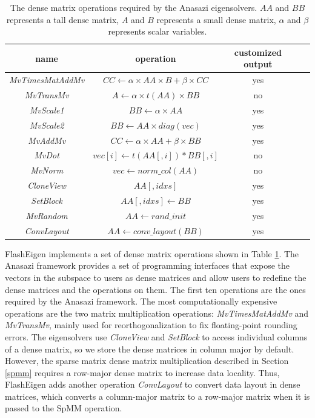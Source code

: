 \begin{table}
	\begin{center}
		\small
		\begin{tabular}{|c|c|c|c|c|}
			\hline
			name & operation & customized output \\
			\hline
			\textit{MvTimesMatAddMv} & $CC \leftarrow \alpha \times AA \times B + \beta \times CC$ & yes \\
			\hline
			\textit{MvTransMv} & $A \leftarrow \alpha \times t(AA) \times BB$ & no \\
			\hline
			\textit{MvScale1} & $BB \leftarrow \alpha \times AA$ & yes \\
			\hline
			\textit{MvScale2} & $BB \leftarrow AA \times diag(vec)$ & yes \\
			\hline
			\textit{MvAddMv} & $CC \leftarrow \alpha \times AA + \beta \times BB$ & yes \\
			\hline
			\textit{MvDot} & $vec[i] \leftarrow t(AA[,i]) * BB[,i]$ & no \\
			\hline
			\textit{MvNorm} & $vec \leftarrow norm\_col(AA)$ & no \\
			\hline
			\textit{CloneView} & $AA[,idxs]$ & yes \\
			\hline
			\textit{SetBlock} & $AA[,idxs] \leftarrow BB$ & yes \\
			\hline
			\textit{MvRandom} & $AA \leftarrow rand\_init$ & yes \\
			\hline
			\textit{ConvLayout} & $AA \leftarrow conv\_layout(BB)$ & yes \\
			\hline
		\end{tabular}
		\normalsize
	\end{center}
	\caption{The dense matrix operations required by the Anasazi eigensolvers.
		$AA$ and $BB$ represents a tall dense matrix, $A$ and $B$ represents
		a small dense matrix, $\alpha$ and $\beta$ represents scalar variables.}
	\label{anasazi_ops}
\end{table}

FlashEigen implements a set of dense matrix operations shown in Table
\ref{anasazi_ops}. The Anasazi framework provides a set of programming
interfaces that expose the vectors in the subspace to users as dense matrices
and allow users to redefine the dense matrices and the operations on them.
The first ten operations are the ones required by the Anasazi
framework. The most computationally expensive operations are the two
matrix multiplication operations: \textit{MvTimesMatAddMv} and \textit{MvTransMv},
mainly used for reorthogonalization to fix floating-point rounding errors.
The eigensolvers use \textit{CloneView} and \textit{SetBlock} to access individual
columns of a dense matrix, so we store the dense matrices in column major by default.
However, the sparse matrix dense matrix multiplication described in Section
\ref{spmm} requires a row-major dense matrix to increase data locality. Thus,
FlashEigen adds another operation \textit{ConvLayout} to convert data layout
in dense matrices, which converts a column-major matrix to a row-major
matrix when it is passed to the SpMM operation.

